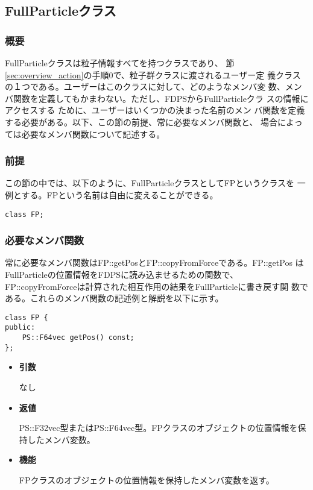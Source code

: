 \subsection{FullParticleクラス}
\label{sec:example_fullparticle}

\subsubsection{概要}

FullParticleクラスは粒子情報すべてを持つクラスであり、
節\ref{sec:overview_action}の手順0で、粒子群クラスに渡されるユーザー定
義クラスの１つである。ユーザーはこのクラスに対して、どのようなメンバ変
数、メンバ関数を定義してもかまわない。ただし、FDPSからFullParticleクラ
スの情報にアクセスする ために、ユーザーはいくつかの決まった名前のメン
バ関数を定義する必要がある。以下、この節の前提、常に必要なメンバ関数と、
場合によっては必要なメンバ関数について記述する。

\subsubsection{前提}

この節の中では、以下のように、FullParticleクラスとしてFPというクラスを
一例とする。FPという名前は自由に変えることができる。
\begin{screen}
\begin{verbatim}
class FP;
\end{verbatim}
\end{screen}

\subsubsection{必要なメンバ関数}


常に必要なメンバ関数はFP::getPosとFP::copyFromForceである。FP::getPos
はFullParticleの位置情報をFDPSに読み込ませるための関数で、
FP::copyFromForceは計算された相互作用の結果をFullParticleに書き戻す関
数である。これらのメンバ関数の記述例と解説を以下に示す。


\begin{screen}
\begin{verbatim}
class FP {
public:
    PS::F64vec getPos() const;
};
\end{verbatim}
\end{screen}

\begin{itemize}

\item {\bf 引数}

  なし
  
\item {\bf 返値}

  PS::F32vec型またはPS::F64vec型。FPクラスのオブジェクトの位置情報を保
  持したメンバ変数。
  
\item {\bf 機能}

  FPクラスのオブジェクトの位置情報を保持したメンバ変数を返す。
  
\end{itemize}

